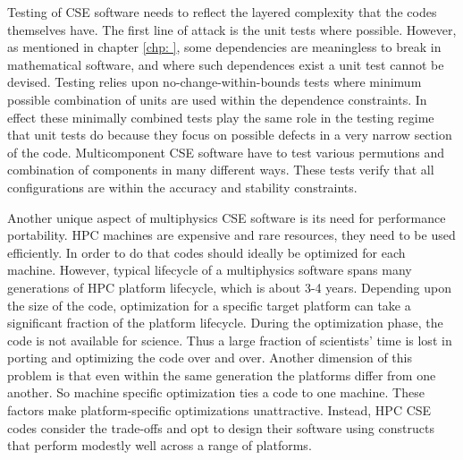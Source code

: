 Testing of CSE software needs to reflect the layered complexity that
the codes themselves have. The first line of attack is the unit tests
where possible. However, as mentioned in chapter \ref{chp: }, some
dependencies are meaningless to break in mathematical software, and
where such dependences exist a unit test cannot be devised. Testing
relies upon no-change-within-bounds tests where minimum possible combination of
units are used within the dependence constraints. In effect these
minimally combined tests play the same role in the testing regime that
unit tests do because they focus on possible defects in a very narrow
section of the code. Multicomponent CSE software have to test various 
permutions and combination of components in many different ways. These
tests verify that all configurations are within the accuracy and stability
constraints.  

Another unique aspect of multiphysics CSE software is its need for
performance portability. HPC machines are expensive and rare resources,
they need to be used efficiently. In order to do that codes should
ideally be optimized for each machine. However, typical lifecycle of a
multiphysics software spans many generations of HPC platform
lifecycle, which is about 3-4 years. Depending upon the size of the
code, optimization for a specific target platform can take a
significant fraction of the platform lifecycle. During the
optimization phase, the code is not available for science. Thus a
large fraction of scientists' time is lost in porting and optimizing
the code over and over. Another dimension of this problem is that even
within the same generation the platforms differ from one another. So
machine specific optimization ties a code to one machine. These
factors make platform-specific optimizations unattractive. Instead,
HPC CSE codes consider the trade-offs and opt to design their software
using constructs that perform modestly well across a range of
platforms. 




